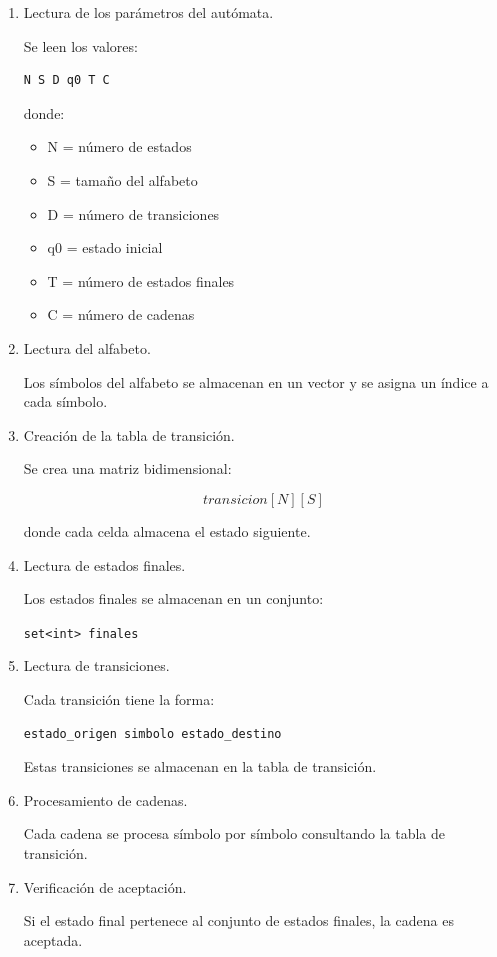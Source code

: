 \documentclass[12pt]{article}
\begin{document}
\begin{enumerate}

\item Lectura de los parámetros del autómata.

Se leen los valores:

\begin{verbatim}
N S D q0 T C
\end{verbatim}

donde:

\begin{itemize}

\item N = número de estados
\item S = tamaño del alfabeto
\item D = número de transiciones
\item q0 = estado inicial
\item T = número de estados finales
\item C = número de cadenas

\end{itemize}

\item Lectura del alfabeto.

Los símbolos del alfabeto se almacenan en un vector y se asigna un índice a cada símbolo.

\item Creación de la tabla de transición.

Se crea una matriz bidimensional:

\[
transicion[N][S]
\]

donde cada celda almacena el estado siguiente.

\item Lectura de estados finales.

Los estados finales se almacenan en un conjunto:

\texttt{set<int> finales}

\item Lectura de transiciones.

Cada transición tiene la forma:

\begin{verbatim}
estado_origen simbolo estado_destino
\end{verbatim}

Estas transiciones se almacenan en la tabla de transición.

\item Procesamiento de cadenas.

Cada cadena se procesa símbolo por símbolo consultando la tabla de transición.

\item Verificación de aceptación.

Si el estado final pertenece al conjunto de estados finales, la cadena es aceptada.

\end{enumerate}
\end{document}
